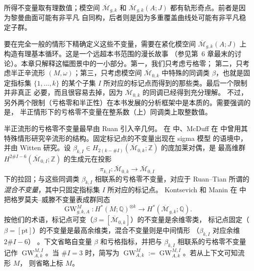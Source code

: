 所得不变量取有理数值；模空间 $\overline{\mathcal M}_{g,k}$ 和
$\overline{\mathcal M}_{g,k}(A;J)$ 都有轨形奇点。前者是因为黎曼曲面可能有非平凡
自同构，后者则是因为多重覆盖曲线处可能有非平凡稳定子群。

要在完全一般的情形下精确定义这些不变量，需要在紧化模空间
$\overline{\mathcal M}_{g,k}(A;J)$ 上构造有理基本循环。这是一个远超本书范围的漫长故事
（参见第~6 章最末的讨论）。本章只解释这幅图景中的一小部分。第一，我们只考虑亏格零；
第二，只考虑半正辛流形 $(M,\omega)$；第三，只考虑模空间
$\overline{\mathcal M}_{0,k}$ 中特殊的同调类 $\beta$，也就是固定指标集
$\{1,\ldots,k\}$ 的某个子集 $I$ 所对应的标记点而得到的那些类。最后一个限制并非真正
必要，而且很容易去掉，因为 $\overline{\mathcal M}_{0,k}$ 的同调已经得到充分理解。
不过，另外两个限制（亏格零和半正性）在本书发展的分析框架中是本质的。需要强调的是，
半正情形下的亏格零不变量在整系数（上）同调类上取整数值。

半正流形的亏格零不变量最早由 Ruan  引入辛几何。
在  中、McDuff 在
 中曾用其特殊情形研究辛流形的结构。固定标记点的不变量出现在 sigma 模型
的语境中，并由 Witten  研究。设
$\beta_{k,I}\in H_{2(k-\#I)}(\overline{\mathcal M}_{0,k};\mathbb Z)$ 的庞加莱对偶，是
最高维群 $H^{2\#I-6}(\overline{\mathcal M}_{0,I};\mathbb Z)$ 的生成元在投影
\[
  \pi_{k,I}:\overline{\mathcal M}_{0,k}\longrightarrow
  \overline{\mathcal M}_{0,I}
\]
下的拉回；与这些同调类 $\beta_{k,I}$ 相联系的亏格零不变量，对应于 Ruan--Tian
 所谓的\emph{混合不变量}，其中只固定指标集 $I$ 所对应的标记点。
Kontsevich 和 Manin 在  中把格罗莫夫--威滕不变量表成群同态
\[
  \operatorname{GW}^{M}_{g,k,A}:
  H^*(M;\mathbb Q)^{\otimes k}
  \longrightarrow H^*(\overline{\mathcal M}_{g,k};\mathbb Q).
\]
按他们的术语，标记点可变（$\beta=[\overline{\mathcal M}_{0,k}]$）的不变量是余维零类，
标记点固定（$\beta=[\mathrm{pt}]$）的不变量是最高余维类，混合不变量则是中间情形
（$\beta_{k,I}$ 对应余维 $2\#I-6$）
。下文省略自变量 $\beta$ 和亏格指标，并把与
$\beta_{k,I}$ 相联系的亏格零不变量记作 $\operatorname{GW}^{M,I}_{A,k}$。当
$\#I=3$ 时，简写为
$\operatorname{GW}^{M}_{A,k}:=\operatorname{GW}^{M,I}_{A,k}$。若从上下文可知流形 $M$，
则省略上标 $M$。

